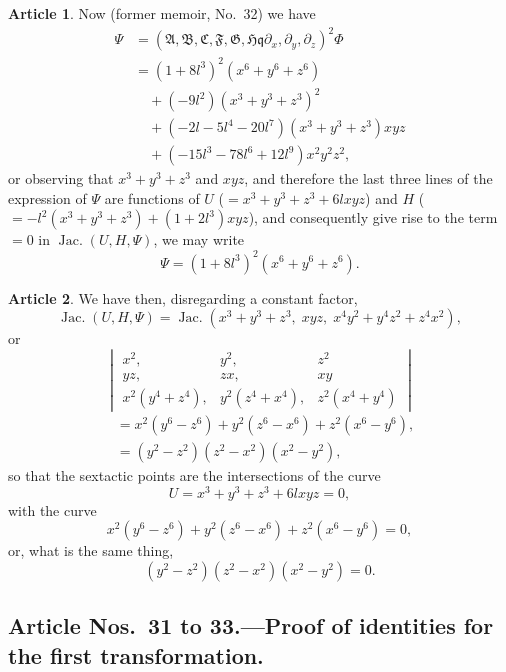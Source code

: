 \documentclass[11pt,a4paper]{article}
\theoremstyle{definition}
\newtheorem{art}{Article}[section]
\DeclareMathOperator{\Jac}{Jac.}
\newcommand{\fA}{\mathfrak{A}}
\newcommand{\fB}{\mathfrak{B}}
\newcommand{\fC}{\mathfrak{C}}
\newcommand{\fF}{\mathfrak{F}}
\newcommand{\fG}{\mathfrak{G}}
\newcommand{\fH}{\mathfrak{H}}
\begin{document}
\begin{art}
Now (former memoir, No.\ 32) we have
\begin{align*}
\Psi &= (\fA, \fB, \fC, \fF, \fG, \fH \mathbin{\mathfrak{q}} \partial_x, \partial_y, \partial_z)^2 \Phi \\
&= (1 + 8l^3)^2 (x^6 + y^6 + z^6) \\
&\quad + (-9l^2)(x^3 + y^3 + z^3)^2 \\
&\quad + (-2l - 5l^4 - 20l^7)(x^3 + y^3 + z^3)xyz \\
&\quad + (-15l^3 - 78l^6 + 12l^9)x^2y^2z^2,
\end{align*}
or observing that $x^3 + y^3 + z^3$ and $xyz$, and therefore the last three lines of the
expression of $\Psi$ are functions of $U$ ($= x^3 + y^3 + z^3 + 6lxyz$) and
$H$ ($= -l^2(x^3 + y^3 + z^3) + (1 + 2l^3)xyz$), and consequently give rise to
the term $=0$ in $\Jac(U, H, \Psi)$, we may write
\[
\Psi = (1 + 8l^3)^2(x^6 + y^6 + z^6).
\]
\end{art}

\begin{art}
We have then, disregarding a constant factor,
\[
\Jac(U, H, \Psi) = \Jac(x^3 + y^3 + z^3,\; xyz,\; x^4y^2 + y^4z^2 + z^4x^2),
\]
or
\[
\begin{vmatrix}
x^2, & y^2, & z^2 \\
yz, & zx, & xy \\
x^2(y^4 + z^4), & y^2(z^4 + x^4), & z^2(x^4 + y^4)
\end{vmatrix}
\]
\begin{align*}
&= x^2(y^6 - z^6) + y^2(z^6 - x^6) + z^2(x^6 - y^6), \\
&= (y^2 - z^2)(z^2 - x^2)(x^2 - y^2),
\end{align*}
so that the sextactic points are the intersections of the curve
\[
U = x^3 + y^3 + z^3 + 6lxyz = 0,
\]
with the curve
\[
x^2(y^6 - z^6) + y^2(z^6 - x^6) + z^2(x^6 - y^6) = 0,
\]
or, what is the same thing,
\[
(y^2 - z^2)(z^2 - x^2)(x^2 - y^2) = 0.
\]
\end{art}

\subsection*{Article Nos.\ 31 to 33.---Proof of identities for the first transformation.}
\end{document}
